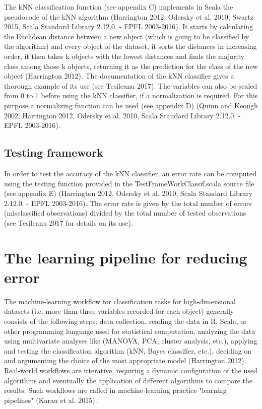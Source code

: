 \documentclass[journal]{IEEEtran}
\begin{document}
The kNN classification function (see appendix C) implements in Scala the pseudocode of the kNN algorithm (Harrington 2012, Odersky et al. 2010, Swartz 2015, Scala Standard Library 2.12.0. - EPFL 2003-2016). 
It starts by calculating the Euclidean distance between a new object (which is going to be classified by the algorithm) and every object of the dataset, it sorts the distances in increasing order, it then takes k objects with the lowest distances and finds the majority class among those k objects, returning it as the prediction for the class of the new object (Harrington 2012).
The documentation of the kNN classifier gives a thorough example of its use (see Tesileanu 2017). 
The variables can also be scaled from 0 to 1 before using the kNN classifier, if a normalization is required. For this purpose a normalizing function can be used (see appendix D) (Quinn and Keough 2002, Harrington 2012, Odersky et al. 2010, Scala Standard Library 2.12.0. - EPFL 2003-2016). 

\subsection{Testing framework}    

In order to test the accuracy of the kNN classifier, an error rate can be computed using the testing function provided in the TestFrameWorkClassif.scala source file (see appendix E) (Harrington 2012, Odersky et al. 2010, Scala Standard Library 2.12.0. - EPFL 2003-2016).
 The error rate is given by the total number of errors (misclassified observations) divided by the total number of tested observations (see Tesileanu 2017 for details on its use). 

\section{The learning pipeline for reducing error}

The machine-learning workflow for classification tasks for high-dimensional datasets (i.e. more than three variables recorded for each object) generally consists of the following steps: data collection, reading the data in R, Scala, or other programming language used for statistical computation, analyzing the data using multivariate analyses like (MANOVA, PCA, cluster analysis, etc.), applying and testing the classification algorithm (kNN, Bayes classifier, etc.), deciding on and argumenting the choice of the most appropriate model (Harrington 2012).
 Real-world workflows are itterative, requiring a dynamic configuration of the used algorithms and eventually the application of different algorithms to compare the results.
 Such workflows are called in machine-learning practice "learning pipelines"  (Karau et al. 2015).\\
\end{document}
